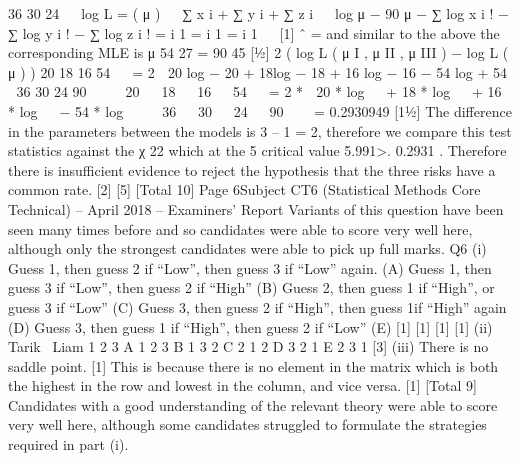 \documentclass[a4paper,12pt]{article}
\begin{document}
36
30
24


log L =
( μ )   ∑ x i + ∑ y i + ∑ z i   log μ − 90 μ − ∑ log x i ! − ∑ log y i ! − ∑ log z i !
= i 1 = i 1 = i 1


[1]
ˆ
=
and similar to the above the corresponding MLE is μ
54 27
=
90 45
[1⁄2]
2 ( log L ( μ I , μ II , μ III ) − log L ( μ ) )
20
18
16
54


= 2  20 log − 20 + 18log − 18 + 16 log − 16 − 54 log + 54 
36
30
24
90



 20 
 18 
 16 
 54  
= 2 *  20 * log   + 18 * log   + 16 * log   − 54 * log   
 36 
 30 
 24 
 90  

= 0.2930949
[11⁄2]
The difference in the parameters between the models is 3 – 1 = 2, therefore we
compare this test statistics against the χ 22 which at the 5%
critical value 5.991>. 0.2931 . Therefore there is insufficient evidence to reject
the hypothesis that the three risks have a common rate.
[2]
[5]
[Total 10]
Page 6Subject CT6 (Statistical Methods Core Technical) – April 2018 – Examiners’ Report
Variants of this question have been seen many times before and so
candidates were able to score very well here, although only the
strongest candidates were able to pick up full marks.
Q6
(i)
Guess 1, then guess 2 if “Low”, then guess 3 if “Low” again. (A)
Guess 1, then guess 3 if “Low”, then guess 2 if “High” (B)
Guess 2, then guess 1 if “High”, or guess 3 if “Low” (C)
Guess 3, then guess 2 if “High”, then guess 1if “High” again (D)
Guess 3, then guess 1 if “High”, then guess 2 if “Low” (E)
[1]
[1]
[1]
[1]
(ii)
Tarik \ Liam
1
2
3
A
1
2
3
B
1
3
2
C
2
1
2
D
3
2
1
E
2
3
1
[3]
(iii)
There is no saddle point.
[1]
This is because there is no element in the matrix which is both the highest in
the row and lowest in the column, and vice versa.
[1]
[Total 9]
Candidates with a good understanding of the relevant theory were able
to score very well here, although some candidates struggled to
formulate the strategies required in part (i).
\end{document}
